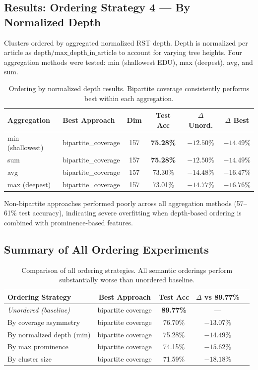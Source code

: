 \documentclass[12pt,a4paper]{article}
\begin{document}
\subsection{Results: Ordering Strategy 4 --- By Normalized Depth}

Clusters ordered by aggregated normalized RST depth. Depth is normalized per article as
$\text{depth}/\text{max\_depth\_in\_article}$ to account for varying tree heights. Four
aggregation methods were tested: min (shallowest EDU), max (deepest), avg, and sum.

\begin{table}[h]
\centering
\small
\begin{tabular}{llcccc}
\hline
\textbf{Aggregation} & \textbf{Best Approach} & \textbf{Dim} & \textbf{Test Acc} & \textbf{$\Delta$ Unord.} & \textbf{$\Delta$ Best} \\
\hline
min (shallowest) & bipartite\_coverage & 157 & \textbf{75.28\%} & $-12.50\%$ & $-14.49\%$ \\
sum & bipartite\_coverage & 157 & \textbf{75.28\%} & $-12.50\%$ & $-14.49\%$ \\
avg & bipartite\_coverage & 157 & 73.30\% & $-14.48\%$ & $-16.47\%$ \\
max (deepest) & bipartite\_coverage & 157 & 73.01\% & $-14.77\%$ & $-16.76\%$ \\
\hline
\end{tabular}
\caption{Ordering by normalized depth results. Bipartite coverage consistently performs best within each aggregation.}
\label{tab:ordering_depth}
\end{table}

Non-bipartite approaches performed poorly across all aggregation methods (57--61\% test accuracy),
indicating severe overfitting when depth-based ordering is combined with prominence-based features.

\subsection{Summary of All Ordering Experiments}

\begin{table}[h]
\centering
\small
\begin{tabular}{lcccc}
\hline
\textbf{Ordering Strategy} & \textbf{Best Approach} & \textbf{Test Acc} & \textbf{$\Delta$ vs 89.77\%} \\
\hline
\textit{Unordered (baseline)} & bipartite coverage & \textbf{89.77\%} & --- \\
\midrule
By coverage asymmetry & bipartite coverage & 76.70\% & $-13.07\%$ \\
By normalized depth (min) & bipartite coverage & 75.28\% & $-14.49\%$ \\
By max prominence & bipartite coverage & 74.15\% & $-15.62\%$ \\
By cluster size & bipartite coverage & 71.59\% & $-18.18\%$ \\
\hline
\end{tabular}
\caption{Comparison of all ordering strategies. All semantic orderings perform substantially worse than unordered baseline.}
\label{tab:ordering_summary}
\end{table}
\end{document}
